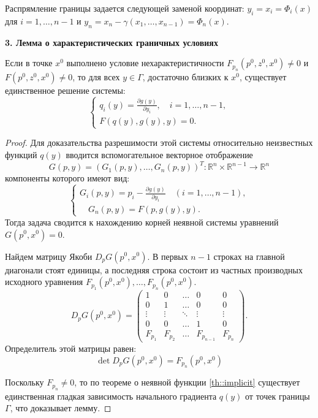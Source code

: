 \begin{definition}
Распрямление границы задается следующей заменой координат: 
  $y_i = x_i = \Phi_i(x)$ для $i = 1, \dots, n-1$ и $y_n = x_n - \gamma(x_1, \dots, x_{n-1}) = \Phi_n(x)$.
\end{definition}

\textbf{3. Лемма о характеристических граничных условиях}

\begin{lemma}
Если в точке $x^0$ выполнено условие нехарактеристичности 
$F_{p_n}(p^0, z^0, x^0) \neq 0$ и $F(p^0, z^0, x^0) \neq 0$, то для всех $y \in \Gamma$,
достаточно близких к $x^0$, существует единственное решение системы:
  \begin{equation}
    \begin{cases}
      q_i(y) = \frac{\partial g(y)}{\partial y_i}, \quad i = 1, \dots, n-1, \\
      F(q(y), g(y), y) = 0.
    \end{cases}
  \end{equation}
\end{lemma}
\begin{proof}
Для доказательства разрешимости этой системы относительно неизвестных функций $q(y)$ 
вводится вспомогательное векторное отображение 
$$G(p, y) = (G_1(p, y), \dots, G_n(p, y))^T \colon \mathbb{R}^n \times \mathbb{R}^{n-1} \to \mathbb{R}^n$$
компоненты которого имеют вид:
\begin{equation}
  \begin{cases}
    G_i(p, y) = p_i - \frac{\partial g(y)}{\partial y_i} \quad (i = 1, \dots, n-1),\\
    \quad G_n(p, y) = F(p, g(y), y).
  \end{cases}
\end{equation}
Тогда задача сводится к нахождению корней неявной системы уравнений $G(p^0, x^0) = 0$.

Найдем матрицу Якоби $D_p G(p^0, x^0)$. В первых $n-1$ строках на главной диагонали 
стоят единицы, а последняя строка состоит из частных производных исходного
уравнения $F_{p_1}(p^0, x^0), \dots, F_{p_n}(p^0, x^0)$.
\begin{equation}
D_p G(p^0, x^0) = \begin{pmatrix}
1 & 0 & \dots & 0 & 0 \\
0 & 1 & \dots & 0 & 0 \\
\vdots & \vdots & \ddots & \vdots & \vdots \\
0 & 0 & \dots & 1 & 0 \\
F_{p_1} & F_{p_2} & \dots & F_{p_{n-1}} & F_{p_n}
\end{pmatrix}.
\end{equation}
Определитель этой матрицы равен:
$$\det D_p G(p^0, x^0) = F_{p_n}(p^0, x^0)$$

Поскольку $F_{p_n} \neq 0$, то по теореме о неявной функции \eqref{th::implicit}
существует единственная гладкая зависимость 
начального градиента $q(y)$ от точек границы $\Gamma$, что доказывает лемму.
\end{proof}

